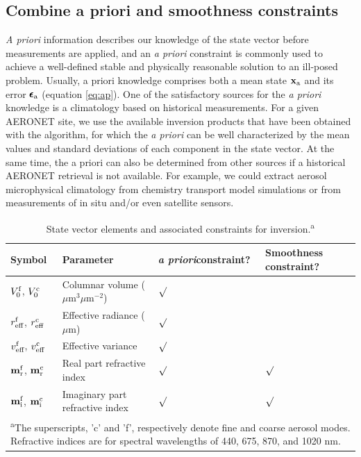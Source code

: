 \subsection{Combine a priori and smoothness constraints}
\label{subsec:ap}

\textit{A priori} information describes our knowledge of the state vector
 before measurements are applied, and an \textit{a priori} constraint is 
commonly used to achieve a well-defined stable and physically reasonable 
solution to an ill-posed problem. Usually, a priori knowledge comprises 
both a mean state $\mathbf{x}_\text{a}$ and its error $\pmb{\epsilon}_\text{a}$ (equation
\eqref{eq:ap}). One of the satisfactory sources for the \textit{a
priori} knowledge is a climatology based on historical measurements. For a given
AERONET site, we use the available inversion products that have been
obtained with the \Dub algorithm, for which the \textit{a priori} can be
well characterized by the mean values and standard deviations of each
component in the state vector. At the same time, the a priori can also
be determined from other sources if a historical AERONET retrieval is not
available. For example, we could extract aerosol microphysical
climatology from chemistry transport model simulations
\citep[e.g.,][]{Wang10} or from measurements of in situ and/or even satellite
sensors.

\begin{table}[t]
  \centering
  \small
  \caption{State vector elements and associated constraints for
inversion.\textsuperscript{a}}
  \label{tab:xpars}
  \begin{tabular}{p{5em} p{15em} p{5em} p{5em} }
    \toprule
       Symbol & Parameter & \textit{a priori}\newline constraint? & Smoothness
constraint? \\
    \midrule
       $V_0^\text{f}$, $V_0^\text{c}$ & Columnar volume ($\mu$m$^3\mu$m$^{-2}$) & 
       $\surd$ & \\
       $r_\text{eff}^\text{f}$, $r_\text{eff}^\text{c}$ & Effective radiance ($\mu$m) &
       $\surd$ & \\
       $v_\text{eff}^\text{f}$, $v_\text{eff}^\text{c}$ & Effective variance  & $\surd$ & \\
       $\mathbf{m}_\text{r}^\text{f}$, $\mathbf{m}_\text{r}^\text{c}$ & 
       Real part refractive index & $\surd$ & $\surd$ \\
       $\mathbf{m}_\text{i}^\text{f}$, $\mathbf{m}_\text{i}^\text{c}$ &
       Imaginary part refractive index & $\surd$ & $\surd$ \\
    \bottomrule
    \multicolumn{4}{m{35em}}{\textsuperscript{a}The superscripts, 'c' and
'f', respectively denote fine and coarse aerosol modes. Refractive indices
are for spectral wavelengths of 440, 675, 870, and 1020 nm.}
  \end{tabular}
\end{table}

